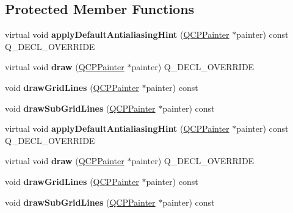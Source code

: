 \subsection*{Protected Member Functions}
\begin{DoxyCompactItemize}
\item 
virtual void {\bfseries apply\+Default\+Antialiasing\+Hint} (\hyperlink{class_q_c_p_painter}{Q\+C\+P\+Painter} $\ast$painter) const Q\+\_\+\+D\+E\+C\+L\+\_\+\+O\+V\+E\+R\+R\+I\+DE\hypertarget{class_q_c_p_grid_a64fa48e16b4629f5df2a5029ab6e761c}{}\label{class_q_c_p_grid_a64fa48e16b4629f5df2a5029ab6e761c}

\item 
virtual void {\bfseries draw} (\hyperlink{class_q_c_p_painter}{Q\+C\+P\+Painter} $\ast$painter) Q\+\_\+\+D\+E\+C\+L\+\_\+\+O\+V\+E\+R\+R\+I\+DE\hypertarget{class_q_c_p_grid_aad9a312d998e2d170956334d4cb80be2}{}\label{class_q_c_p_grid_aad9a312d998e2d170956334d4cb80be2}

\item 
void {\bfseries draw\+Grid\+Lines} (\hyperlink{class_q_c_p_painter}{Q\+C\+P\+Painter} $\ast$painter) const \hypertarget{class_q_c_p_grid_a3aff10e993f6625e255c19e4f97a09d8}{}\label{class_q_c_p_grid_a3aff10e993f6625e255c19e4f97a09d8}

\item 
void {\bfseries draw\+Sub\+Grid\+Lines} (\hyperlink{class_q_c_p_painter}{Q\+C\+P\+Painter} $\ast$painter) const \hypertarget{class_q_c_p_grid_afa5d9d12de419e881f381f2ab7cb414d}{}\label{class_q_c_p_grid_afa5d9d12de419e881f381f2ab7cb414d}

\item 
virtual void {\bfseries apply\+Default\+Antialiasing\+Hint} (\hyperlink{class_q_c_p_painter}{Q\+C\+P\+Painter} $\ast$painter) const Q\+\_\+\+D\+E\+C\+L\+\_\+\+O\+V\+E\+R\+R\+I\+DE\hypertarget{class_q_c_p_grid_a8c5a09c3767242edcb518aded102f7df}{}\label{class_q_c_p_grid_a8c5a09c3767242edcb518aded102f7df}

\item 
virtual void {\bfseries draw} (\hyperlink{class_q_c_p_painter}{Q\+C\+P\+Painter} $\ast$painter) Q\+\_\+\+D\+E\+C\+L\+\_\+\+O\+V\+E\+R\+R\+I\+DE\hypertarget{class_q_c_p_grid_ad0f9695ee58c60c7995e66ce21394e03}{}\label{class_q_c_p_grid_ad0f9695ee58c60c7995e66ce21394e03}

\item 
void {\bfseries draw\+Grid\+Lines} (\hyperlink{class_q_c_p_painter}{Q\+C\+P\+Painter} $\ast$painter) const \hypertarget{class_q_c_p_grid_a3aff10e993f6625e255c19e4f97a09d8}{}\label{class_q_c_p_grid_a3aff10e993f6625e255c19e4f97a09d8}

\item 
void {\bfseries draw\+Sub\+Grid\+Lines} (\hyperlink{class_q_c_p_painter}{Q\+C\+P\+Painter} $\ast$painter) const \hypertarget{class_q_c_p_grid_afa5d9d12de419e881f381f2ab7cb414d}{}\label{class_q_c_p_grid_afa5d9d12de419e881f381f2ab7cb414d}

\end{DoxyCompactItemize}
